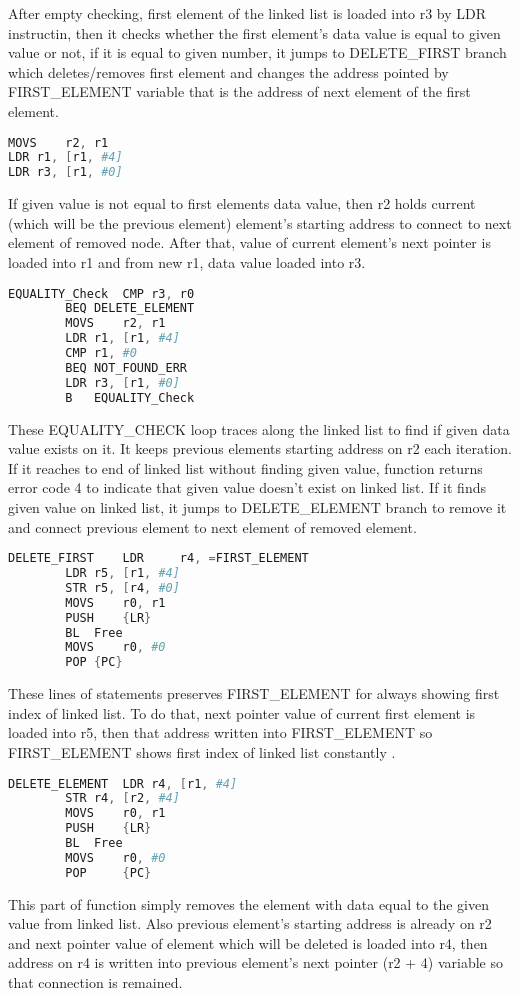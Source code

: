 \documentclass[pdftex,12pt,a4paper]{article}
\begin{document}
After empty checking, first element of the linked list is loaded into r3 by LDR instructin, then it checks whether the first element’s data value is equal to given value or not, if it is equal to given number, it jumps to DELETE\_FIRST branch which deletes/removes first element and changes the address pointed by FIRST\_ELEMENT variable that is the address of next element of the first element.
\begin{lstlisting}[language=Assembler]
MOVS	r2, r1
LDR	r1, [r1, #4]			
LDR	r3, [r1, #0]
\end{lstlisting}
If given value is not equal to first elements data value, then r2 holds current (which will be the previous element) element’s starting address to connect to next element of removed node. After that, value of current element’s next pointer is loaded into r1 and from new r1, data value loaded into r3.
\begin{lstlisting}[language=Assembler]
EQUALITY_Check  CMP	r3, r0
		BEQ	DELETE_ELEMENT
		MOVS	r2, r1
		LDR	r1, [r1, #4]
		CMP	r1, #0					
		BEQ	NOT_FOUND_ERR
		LDR	r3, [r1, #0]
		B	EQUALITY_Check
\end{lstlisting}
These EQUALITY\_CHECK loop traces along the linked list to find if given data value exists on it.  It keeps previous elements starting address on r2 each iteration. 
If it reaches to end of linked list without finding given value, function returns error code 4 to indicate that given value doesn’t exist on linked list.
If it finds given value on linked list, it jumps to DELETE\_ELEMENT branch to remove it and connect previous element to next element of removed element.
\begin{lstlisting}[language=Assembler]
DELETE_FIRST	LDR 	r4, =FIRST_ELEMENT	
		LDR	r5, [r1, #4]
		STR	r5, [r4, #0]
		MOVS	r0, r1
		PUSH	{LR}
		BL	Free
		MOVS	r0, #0
		POP {PC}
\end{lstlisting}	
These lines of statements preserves FIRST\_ELEMENT for always showing first index of linked list. To do that, next pointer value of current first element is loaded into r5, then that address written into FIRST\_ELEMENT so FIRST\_ELEMENT shows first index of linked list constantly .
\begin{lstlisting}[language=Assembler]
DELETE_ELEMENT	LDR	r4, [r1, #4]		
		STR	r4, [r2, #4]
		MOVS	r0, r1
		PUSH 	{LR}
		BL	Free
		MOVS	r0, #0
		POP 	{PC}
\end{lstlisting}
This part of function simply removes the element with data equal to the given value from linked list. Also previous element’s starting address is already on r2 and next pointer value of element which will be deleted is loaded into r4, then address on r4 is written into previous element’s next pointer (r2 + 4) variable so that connection is remained.
\end{document}
